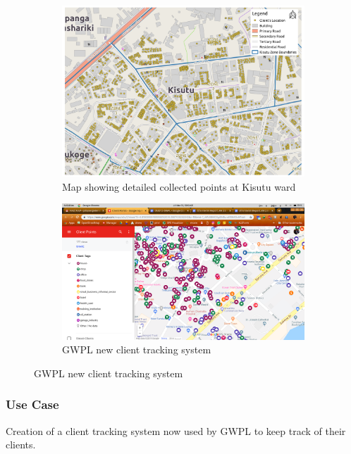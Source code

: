 \documentclass[a4paper,12pt,twoside]{article}
\begin{document}
\begin{figure}
  \begin{subfigure}[b]{0.4\textwidth}
   \includegraphics[width=\textwidth]{images/GWPL_client_map.png}
   \color{RHgreen}\caption{Map showing detailed collected points at Kisutu ward}
    \label{fig:1}
  \end{subfigure}
  \begin{subfigure}[b]{0.5\textwidth}
   \includegraphics[width=\textwidth]{images/GWPL_client_tracking_system.png}
    \color{RHgreen}\caption{GWPL new client tracking system}
    \label{fig:2}
  \end{subfigure}
\end{figure}

\subsubsection{Use Case}
Creation of a client tracking system now used by GWPL to keep track of their clients.
\end{document}
